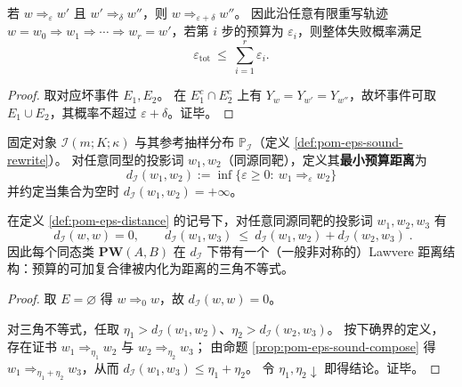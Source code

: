 \begin{proposition}[误差预算的可加复合律]\label{prop:pom-eps-sound-compose}
若 \(w\Longrightarrow_{\varepsilon}w'\) 且 \(w'\Longrightarrow_{\delta}w''\)，则 \(w\Longrightarrow_{\varepsilon+\delta}w''\)。
因此沿任意有限重写轨迹 \(w=w_0\Rightarrow w_1\Rightarrow\cdots\Rightarrow w_r=w'\)，若第 \(i\) 步的预算为 \(\varepsilon_i\)，则整体失败概率满足
\[
\varepsilon_{\mathrm{tot}}\ \le\ \sum_{i=1}^{r}\varepsilon_i.
\]
\end{proposition}
\begin{proof}
取对应坏事件 \(E_1,E_2\)。
在 \(E_1^c\cap E_2^c\) 上有 \(Y_w=Y_{w'}=Y_{w''}\)，故坏事件可取 \(E_1\cup E_2\)，其概率不超过 \(\varepsilon+\delta\)。证毕。
\end{proof}

\begin{definition}\label{def:pom-eps-distance}
固定对象 \(\mathcal{I}(m;K;\kappa)\) 与其参考抽样分布 \(\mathbb{P}_{\mathcal I}\)（定义 \ref{def:pom-eps-sound-rewrite}）。
对任意同型的投影词 \(w_1,w_2\)（同源同靶），定义其\textbf{最小预算距离}为
\[
\boxed{\;
d_{\mathcal I}(w_1,w_2)
:=
\inf\{\varepsilon\ge 0:\ w_1\Longrightarrow_{\varepsilon} w_2\}\;}
\]
并约定当集合为空时 \(d_{\mathcal I}(w_1,w_2)=+\infty\)。
\end{definition}

\begin{proposition}\label{prop:pom-eps-distance-lawvere}
在定义 \ref{def:pom-eps-distance} 的记号下，对任意同源同靶的投影词 \(w_1,w_2,w_3\) 有
\[
\boxed{\;
d_{\mathcal I}(w,w)=0,\qquad
d_{\mathcal I}(w_1,w_3)\ \le\ d_{\mathcal I}(w_1,w_2)+d_{\mathcal I}(w_2,w_3)\; }.
\]
因此每个同态类 \(\mathbf{PW}(A,B)\) 在 \(d_{\mathcal I}\) 下带有一个（一般非对称的）Lawvere 距离结构：预算的可加复合律被内化为距离的三角不等式。
\end{proposition}
\begin{proof}
取 \(E=\varnothing\) 得 \(w\Longrightarrow_0 w\)，故 \(d_{\mathcal I}(w,w)=0\)。
\par
对三角不等式，任取 \(\eta_1>d_{\mathcal I}(w_1,w_2)\)、\(\eta_2>d_{\mathcal I}(w_2,w_3)\)。
按下确界的定义，存在证书 \(w_1\Longrightarrow_{\eta_1} w_2\) 与 \(w_2\Longrightarrow_{\eta_2} w_3\)；
由命题 \ref{prop:pom-eps-sound-compose} 得 \(w_1\Longrightarrow_{\eta_1+\eta_2} w_3\)，从而
\(
d_{\mathcal I}(w_1,w_3)\le \eta_1+\eta_2
\)。
令 \(\eta_1,\eta_2\downarrow\) 即得结论。证毕。
\end{proof}

